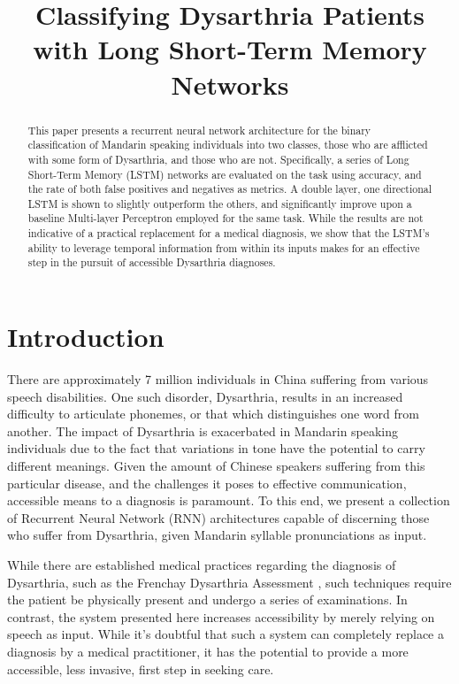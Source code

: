 \documentclass[conference]{IEEEtran}
\begin{document}
\title{Classifying Dysarthria Patients with Long Short-Term Memory Networks}

\author{
}

\maketitle

\begin{abstract}
This paper presents a recurrent neural network architecture for the binary classification of Mandarin speaking individuals into two classes, those who are afflicted with some form of Dysarthria, and those who are not. Specifically, a series of Long Short-Term Memory (LSTM) networks are evaluated on the task using accuracy, and the rate of both false positives and negatives as metrics. A double layer, one directional LSTM is shown to slightly outperform the others, and significantly improve upon a baseline Multi-layer Perceptron  employed for the same task. While the results are not indicative of a practical replacement for a medical diagnosis, we show that the LSTM's ability to leverage temporal information from within its inputs makes for an effective step in the pursuit of accessible Dysarthria diagnoses. 
\end{abstract}

\section{Introduction}
There are approximately 7 million individuals in China suffering from various speech disabilities. One such disorder, Dysarthria, results in an increased difficulty to articulate phonemes, or that which distinguishes one word from another. The impact of Dysarthria is exacerbated in Mandarin speaking individuals due to the fact that variations in tone have the potential to carry different meanings. Given the amount of Chinese speakers suffering from this particular disease, and the challenges it poses to effective communication, accessible means to a diagnosis is paramount. To this end, we present a collection of Recurrent Neural Network (RNN) architectures capable of discerning those who suffer from Dysarthria, given Mandarin syllable pronunciations as input. 

While there are established medical practices regarding the diagnosis of Dysarthria, such as the Frenchay Dysarthria Assessment \cite{enderby1980frenchay}, such techniques require the patient be physically present and undergo a series of examinations. In contrast, the system presented here increases accessibility by merely relying on speech as input. While it's doubtful that such a system can completely replace a diagnosis by a medical practitioner, it has the potential to provide a more accessible, less invasive, first step in seeking care. 
\end{document}
